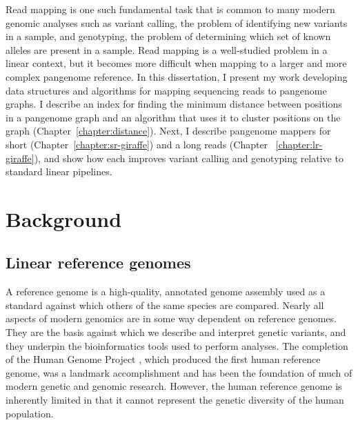\documentclass[11pt]{ucscthesis}
\begin{document}
Read mapping is one such fundamental task that is common to many modern genomic analyses such as variant calling, the problem of identifying new variants in a sample, and genotyping, the problem of determining which set of known alleles are present in a sample.
Read mapping is a well-studied problem in a linear context, but it becomes more difficult when mapping to a larger and more complex pangenome reference.
In this dissertation, I present my work developing data structures and algorithms for mapping sequencing reads to pangenome graphs.
I describe an index for finding the minimum distance between positions in a pangenome graph and an algorithm that uses it to cluster positions on the graph (Chapter~\ref{chapter:distance}).
Next, I describe pangenome mappers for short (Chapter~\ref{chapter:sr-giraffe}) and a long reads (Chapter ~\ref{chapter:lr-giraffe}), and show how each improves variant calling and genotyping relative to standard linear pipelines.

\chapter{Background}
\label{chapter:background}

\section{Linear reference genomes}
\label{sec:background:linear-genomes}

A reference genome is a high-quality, annotated genome assembly used as a standard against which others of the same species are compared. 
Nearly all aspects of modern genomics are in some way dependent on reference genomes.
They are the basis against which we describe and interpret genetic variants, and they underpin the bioinformatics tools used to perform analyses.
The completion of the Human Genome Project \cite{lander_initial_2001}, which produced the first human reference genome, was a landmark accomplishment and has been the foundation of much of modern genetic and genomic research.
However, the human reference genome is inherently limited in that it cannot represent the genetic diversity of the human population.
\end{document}
